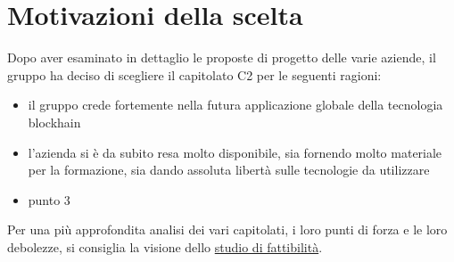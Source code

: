 \section{Motivazioni della scelta}\label{section:motivazioni}

Dopo aver esaminato in dettaglio le proposte di progetto delle varie aziende,
 il gruppo ha deciso di scegliere il capitolato C2 per le seguenti ragioni:
\begin{itemize}
    \item il gruppo crede fortemente nella futura applicazione globale della tecnologia blockhain
    \item l'azienda si è da subito resa molto disponibile, sia fornendo molto materiale per la formazione, sia dando assoluta libertà sulle tecnologie da utilizzare
    \item punto 3 
\end{itemize}

Per una più approfondita analisi dei vari capitolati,
 i loro punti di forza e le loro debolezze, si consiglia la visione dello \href{https://yakuzaishi-swe.github.io/docs/docs/studio_fattibilita.pdf}{studio di fattibilità}.